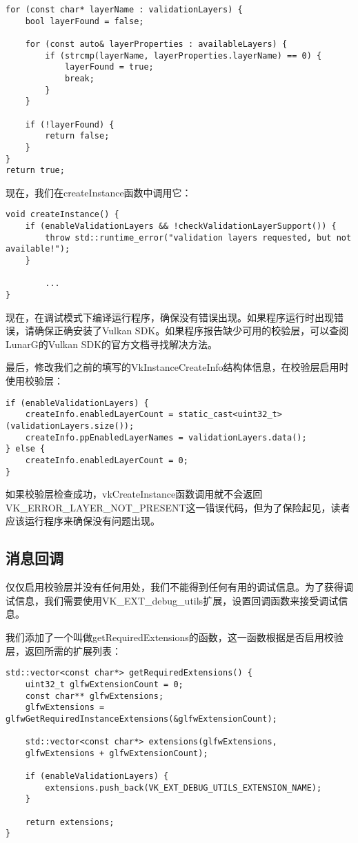 \begin{lstlisting}[language={[ANSI]C}]
for (const char* layerName : validationLayers) {
	bool layerFound = false;

	for (const auto& layerProperties : availableLayers) {
		if (strcmp(layerName, layerProperties.layerName) == 0) {
			layerFound = true;
			break;
		}
	}

	if (!layerFound) {
		return false;
	}
}
return true;
\end{lstlisting}

现在，我们在createInstance函数中调用它：

\begin{lstlisting}[language={[ANSI]C}]
void createInstance() {
	if (enableValidationLayers && !checkValidationLayerSupport()) {
		throw std::runtime_error("validation layers requested, but not available!");
	}

		...
}
\end{lstlisting}

现在，在调试模式下编译运行程序，确保没有错误出现。如果程序运行时出现错误，请确保正确安装了Vulkan SDK。如果程序报告缺少可用的校验层，可以查阅LunarG的Vulkan SDK的官方文档寻找解决方法。

最后，修改我们之前的填写的VkInstanceCreateInfo结构体信息，在校验层启用时使用校验层：

\begin{lstlisting}[language={[ANSI]C}]
if (enableValidationLayers) {
	createInfo.enabledLayerCount = static_cast<uint32_t>(validationLayers.size());
	createInfo.ppEnabledLayerNames = validationLayers.data();
} else {
	createInfo.enabledLayerCount = 0;
}
\end{lstlisting}

如果校验层检查成功，vkCreateInstance函数调用就不会返回VK\_ERROR\_LAYER\_NOT\_PRESENT这一错误代码，但为了保险起见，读者应该运行程序来确保没有问题出现。

\subsection{消息回调}

仅仅启用校验层并没有任何用处，我们不能得到任何有用的调试信息。为了获得调试信息，我们需要使用VK\_EXT\_debug\_utils扩展，设置回调函数来接受调试信息。

我们添加了一个叫做getRequiredExtensions的函数，这一函数根据是否启用校验层，返回所需的扩展列表：

\begin{lstlisting}[language={[ANSI]C}]
std::vector<const char*> getRequiredExtensions() {
	uint32_t glfwExtensionCount = 0;
	const char** glfwExtensions;
	glfwExtensions = glfwGetRequiredInstanceExtensions(&glfwExtensionCount);

	std::vector<const char*> extensions(glfwExtensions,
	glfwExtensions + glfwExtensionCount);

	if (enableValidationLayers) {
		extensions.push_back(VK_EXT_DEBUG_UTILS_EXTENSION_NAME);
	}

	return extensions;
}
\end{lstlisting}

